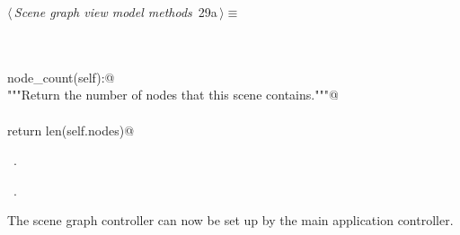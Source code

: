 \documentclass[
    a4paper,      %
    10pt,         %
    openright,    %
    notitlepage,  %
    parskip=half, %
]{scrreprt}       %
\theoremstyle{definition}                    %
\begin{document}
\begin{flushleft} \small
\begin{minipage}{\linewidth}\label{scrap29}\raggedright\small
{} $\langle\,${\itshape Scene graph view model methods}\nobreak\ {\footnotesize {29a}}$\,\rangle\equiv$
\vspace{-1ex}
\begin{list}{}{} \item
\mbox{}\lstinline@@\\
\mbox{}\lstinline@property@\\
\mbox{}\lstinline@def node_count(self):@\\
\mbox{}\lstinline@    """Return the number of nodes that this scene contains."""@\\
\mbox{}\lstinline@@\\
\mbox{}\lstinline@    return len(self.nodes)@\\
\mbox{}\lstinline@@{\NWsep}
\end{list}
\vspace{-1.5ex}
\footnotesize
\begin{list}{}{\setlength{\itemsep}{-\parsep}\setlength{\itemindent}{-\leftmargin}}
\item \NWtxtMacroDefBy\ .
\item \NWtxtMacroRefIn\ .

\item{}
\end{list}
\end{minipage}\vspace{4ex}
\end{flushleft}

The scene graph controller can now be set up by the main application controller.
\end{document}
